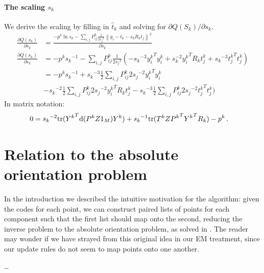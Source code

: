 \documentclass[10pt,a4paper,oneside]{article}
\theoremstyle{definition}
\newcommand{\p}{\mbox{\,.}}
\theoremstyle{definition}
\begin{document}
\paragraph{The scaling $s_k$}
We derive the scaling by filling in $\hat t_k$ and solving for $\partial Q(S_k)/\partial s_k$.
\begin{align*}
\frac{\partial Q(s_k)}{\partial s_k} &=  \frac{- p^k \ln s_k - \sum_{i,j} P^k_{ij} \frac{1}{2{s_j}^2} \left\|y_i - t_k - s_k R_k t_j \right\|^2}{\partial s_k}\\
\frac{\partial Q(s_k)}{\partial s_k} &= - p^k {s_k}^{-1} - \sum_{i,j} P^k_{ij} \frac{1}{2{s_j}^2} \left(-{s_k}^{-3} {y^k_i}^T y^k_i + {s_k^{-2}} {y^k_i}^TR_kt_j^k + {s_k}^{-3}{t_j^k}^T t_j^k\right) \\
&= - p^k {s_k}^{-1} + {s_k}^{-3} \frac{1}{2}\sum_{i,j} P^k_{ij} 2{s_j}^{-2} {y^k_i}^T y^k_i \\ 
& - {s_k}^{-2} \frac{1}{2}\sum_{i,j} P^k_{ij} 2{s_j}^{-2} {y^k_i}^TR_kt_j^k - {s_k}^{-3} \frac{1}{2}\sum_{i,j} P^k_{ij} 2{s_j}^{-2} {t_j^k}^T t_j^k)
\end{align*}
In matrix notation:
\begin{align*}
0 &= {s_k}^{-2} \text{tr}({Y^k}^T\text{d}(P^kZ1_M)Y^k) + {s_k}^{-1} \text{tr}(T^kZ{P^k}^T{Y^k}^TR_k) -p^k \p
\end{align*}

\section{Relation to the absolute orientation problem}

In the introduction we described the intuitive motivation for the algorithm: given the codes for each point, we can construct paired lists of points for each component such that the first list should map onto the second, reducing the inverse problem to the absolute orientation problem, as solved in \cite{umeyama1991least}. The reader may wonder if we have strayed from this original idea in our EM treatment, since our update rules do not seem to map points onto one another.   

\ldots
\end{document}
